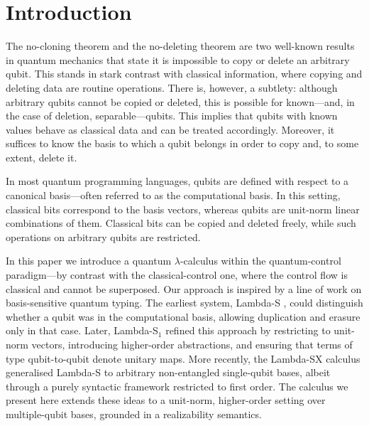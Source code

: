 \documentclass[runningheads,orivec,envcountsame,envcountsect]{llncs}
\begin{document}
\section{Introduction}
The no-cloning theorem \cite{WoottersZurek1982} and the no-deleting theorem
\cite{PatiBraunstein2000} are two well-known results in quantum mechanics that
state it is impossible to copy or delete an arbitrary qubit. This stands in
stark contrast with classical information, where copying and deleting data are
routine operations. There is, however, a subtlety: although arbitrary qubits
cannot be copied or deleted, this is possible for known---and, in the case of
deletion, separable---qubits. This implies that qubits with known values behave
as classical data and can be treated accordingly. Moreover, it suffices to know
the basis to which a qubit belongs in order to copy and, to some extent, delete it.

In most quantum programming languages, qubits are defined with respect to a
canonical basis—often referred to as the computational basis. In this setting,
classical bits correspond to the basis vectors, whereas qubits are unit-norm
linear combinations of them. Classical bits can be copied and deleted freely,
while such operations on arbitrary qubits are restricted.

In this paper we introduce a quantum $\lambda$-calculus within the
quantum-control paradigm—by contrast with the classical-control one, where the
control flow is classical and cannot be superposed. Our approach is inspired by
a line of work on basis-sensitive quantum typing. The earliest system,
Lambda-S \cite{DiazcaroDowekRinaldiBIO19}, could distinguish whether a qubit
was in the computational basis, allowing duplication and erasure only in that
case. Later, Lambda-S$_1$
\cite{DiazcaroGuillermoMiquelValironLICS19,DiazCaroMalherbe2022} refined this
approach by restricting to unit-norm vectors, introducing higher-order
abstractions, and ensuring that terms of type qubit-to-qubit denote unitary
maps. More recently, the Lambda-SX calculus \cite{DiazcaroMonzonAPLAS25}
generalised Lambda-S to arbitrary non-entangled single-qubit bases, albeit
through a purely syntactic framework restricted to first order. The calculus we
present here extends these ideas to a unit-norm, higher-order setting over
multiple-qubit bases, grounded in a realizability semantics.
\end{document}
